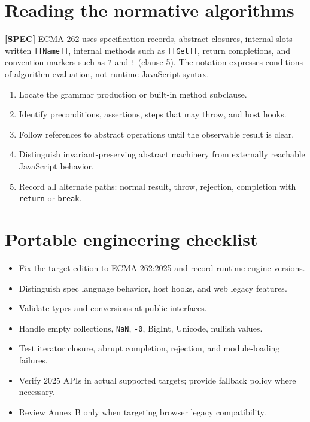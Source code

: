\documentclass[11pt,letterpaper]{article}
\providecommand{\tightlist}{\setlength{\itemsep}{0pt}\setlength{\parskip}{0pt}}
\newcommand{\passthrough}[1]{#1}
\begin{document}
\section{Reading the normative algorithms}\label{reading-the-normative-algorithms}

\textbf{{[}SPEC{]}} ECMA-262 uses specification records, abstract closures, internal slots written \passthrough{\lstinline![[Name]]!}, internal methods such as \passthrough{\lstinline![[Get]]!}, return completions, and convention markers such as \passthrough{\lstinline!?!} and \passthrough{\lstinline"!"} (clause 5). The notation expresses conditions of algorithm evaluation, not runtime JavaScript syntax.

\begin{enumerate}
\def\labelenumi{\arabic{enumi}.}
\tightlist
\item
  Locate the grammar production or built-in method subclause.
\item
  Identify preconditions, assertions, steps that may throw, and host hooks.
\item
  Follow references to abstract operations until the observable result is clear.
\item
  Distinguish invariant-preserving abstract machinery from externally reachable JavaScript behavior.
\item
  Record all alternate paths: normal result, throw, rejection, completion with \passthrough{\lstinline!return!} or \passthrough{\lstinline!break!}.
\end{enumerate}

\section{Portable engineering checklist}\label{portable-engineering-checklist}

\begin{itemize}
\tightlist
\item[$\square$]
  Fix the target edition to ECMA-262:2025 and record runtime engine versions.
\item[$\square$]
  Distinguish spec language behavior, host hooks, and web legacy features.
\item[$\square$]
  Validate types and conversions at public interfaces.
\item[$\square$]
  Handle empty collections, \passthrough{\lstinline!NaN!}, \passthrough{\lstinline!-0!}, BigInt, Unicode, nullish values.
\item[$\square$]
  Test iterator closure, abrupt completion, rejection, and module-loading failures.
\item[$\square$]
  Verify 2025 APIs in actual supported targets; provide fallback policy where necessary.
\item[$\square$]
  Review Annex B only when targeting browser legacy compatibility.
\end{itemize}
\end{document}
